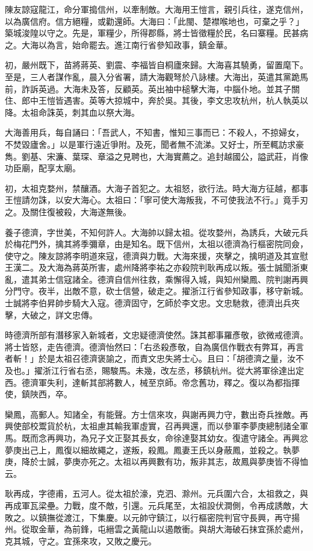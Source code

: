 \begin{pinyinscope}
陳友諒寇龍江，命分軍搗信州，以牽制敵。大海用王愷言，親引兵往，遂克信州，以為廣信府。信方絕糧，或勸還師。大海曰：「此閩、楚襟喉地也，可棄之乎？」築城浚隍以守之。先是，軍糧少，所得郡縣，將士皆徵糧於民，名曰寨糧。民甚病之。大海以為言，始命罷去。進江南行省參知政事，鎮金華。

初，嚴州既下，苗將蔣英、劉震、李福皆自桐廬來歸。大海喜其驍勇，留置麾下。至是，三人者謀作亂，晨入分省署，請大海觀弩於八詠樓。大海出，英遣其黨跪馬前，詐訴英過。大海未及答，反顧英。英出袖中槌擊大海，中腦仆地。並其子關住、郎中王愷皆遇害。英等大掠城中，奔於吳。其後，李文忠攻杭州，杭人執英以降。太祖命誅英，刺其血以祭大海。

大海善用兵，每自誦曰：「吾武人，不知書，惟知三事而已：不殺人，不掠婦女，不焚毀廬舍。」以是軍行遠近爭附。及死，聞者無不流涕。又好士，所至輒訪求豪雋。劉基、宋濂、葉琛、章溢之見聘也，大海實薦之。追封越國公，謚武莊，肖像功臣廟，配享太廟。

初，太祖克婺州，禁釀酒。大海子首犯之。太祖怒，欲行法。時大海方征越，都事王愷請勿誅，以安大海心。太祖曰：「寧可使大海叛我，不可使我法不行。」竟手刃之。及關住復被殺，大海遂無後。

養子德濟，字世美，不知何許人。大海帥以歸太祖。從攻婺州，為誘兵，大破元兵於梅花門外，擒其將季彌章，由是知名。既下信州，太祖以德濟為行樞密院同僉，使守之。陳友諒將李明道來寇，德濟與力戰。大海來援，夾擊之，擒明道及其宣慰王漢二。及大海為蔣英所害，處州降將李祐之亦殺院判耿再成以叛。張士誠聞浙東亂，遣其弟士信寇諸全。德濟自信州往救，乘懈得入城，與知州欒鳳、院判謝再興分門守。夜半，出敵不意，砍士信營，破走之。擢浙江行省參知政事，移守新城。士誠將李伯昇帥步騎大入寇。德濟固守，乞師於李文忠。文忠馳救，德濟出兵夾擊，大破之，詳文忠傳。

時德濟所部有潛移家入新城者，文忠疑德濟使然。誅其都事羅彥敬，欲微戒德濟。將士皆怒，走告德濟。德濟怡然曰：「右丞殺彥敬，自為廣信作戰衣有弊耳，再言者斬！」於是太祖召德濟褒諭之，而責文忠失將士心。且曰：「胡德濟之量，汝不及也。」擢浙江行省右丞，賜駿馬。未幾，改左丞，移鎮杭州。從大將軍徐達出定西。德濟軍失利，達斬其部將數人，械至京師。帝念舊功，釋之。復以為都指揮使，鎮陜西，卒。

欒鳳，高郵人。知諸全，有能聲。方士信來攻，與謝再興力守，數出奇兵挫敵。再興使部校鬻貨於杭，太祖慮其輸我軍虛實，召再興還，而以參軍李夢庚總制諸全軍馬。既而念再興功，為兄子文正娶其長女，命徐達娶其幼女。復遣守諸全。再興忿夢庚出己上，鳳復以細故繩之，遂叛，殺鳳。鳳妻王氏以身蔽鳳，並殺之。執夢庚，降於士誠，夢庚亦死之。太祖以再興數有功，叛非其志，故鳳與夢庚皆不得恤云。

耿再成，字德甫，五河人。從太祖於濠，克泗、滁州。元兵圍六合，太祖救之，與再成軍瓦梁壘。力戰，度不敵，引還。元兵尾至，太祖設伏澗側，令再成誘敵，大敗之。以鎮撫從渡江，下集慶。以元帥守鎮江，以行樞密院判官守長興，再守揚州。從取金華，為前鋒，屯縉雲之黃龍山以遏敵衝。與胡大海破石抹宜孫於處州，克其城，守之。宜孫來攻，又敗之慶元。


\end{pinyinscope}

